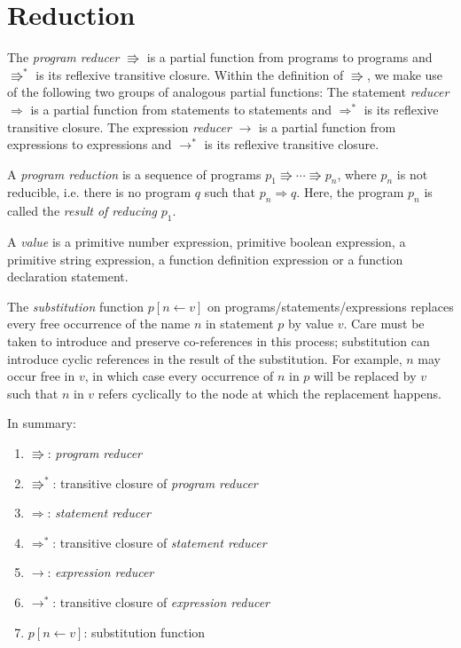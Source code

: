 \section*{Reduction}

The 
\emph{program reducer} $\Rrightarrow$ is a partial function from
programs to
programs
and $\Rrightarrow^*$ is its reflexive transitive closure.
Within the definition of $\Rrightarrow$, we make use of
the following two groups of analogous partial functions:
The statement
\emph{reducer} $\Rightarrow$ is a partial function from
statements to statements
and $\Rightarrow^*$ is its reflexive transitive closure.
The expression
\emph{reducer} $\rightarrow$ is a partial function from
expressions to expressions
and $\rightarrow^*$ is its reflexive transitive closure.

A \emph{program reduction} is a sequence of programs
$p_1 \Rrightarrow \cdots \Rrightarrow p_n$,
where $p_n$ is not reducible, i.e. there is no
program $q$ such that $p_n \Rightarrow q$.
Here, the program $p_n$ is called the \emph{result
of reducing} $p_1$.

A \emph{value} is a primitive number expression,
primitive boolean expression,
a primitive string expression, a function definition
expression or a function declaration statement.

The \emph{substitution} function 
$p [ n \leftarrow v ]$ on programs/statements/expressions
replaces every free occurrence of the name $n$
in statement $p$ by value $v$. Care must be taken to introduce
and preserve
co-references in this process; substitution can introduce
cyclic references in the result of the substitution. For example,
$n$ may occur free in $v$, in which case
every occurrence of $n$ in $p$
will be replaced by $v$ such that $n$ in $v$ refers cyclically
to the node at which the replacement happens.

In summary:

\begin{enumerate}
\item $\Rrightarrow$: \emph{program reducer}
\item $\Rrightarrow^*$: transitive closure of \emph{program reducer}
\item $\Rightarrow$: \emph{statement reducer}
\item $\Rightarrow^*$: transitive closure of \emph{statement reducer}
\item $\rightarrow$: \emph{expression reducer}
\item $\rightarrow^*$: transitive closure of \emph{expression reducer}
\item $p [ n \leftarrow v ]$: substitution function
\end{enumerate}

